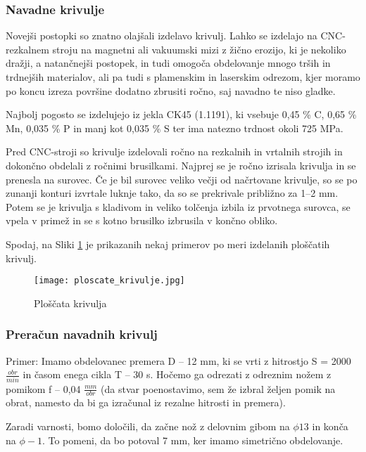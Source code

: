 \subsubsection{Navadne krivulje}
Novejši postopki so znatno olajšali izdelavo krivulj.
Lahko se izdelajo na CNC-rezkalnem stroju na magnetni ali vakuumski mizi
z žično erozijo, ki je nekoliko dražji, a natančnejši postopek, in tudi omogoča
obdelovanje mnogo trših in trdnejših materialov, ali pa tudi s
plamenskim in laserskim odrezom, kjer moramo po koncu izreza površine
dodatno zbrusiti ročno, saj navadno te niso gladke.

Najbolj pogosto se izdelujejo iz jekla CK45 (1.1191), ki vsebuje
0,45 \% C, 0,65 \% Mn, 0,035 \% P in manj kot 0,035 \% S ter ima natezno trdnost okoli 725 MPa. \cite{interna}

Pred CNC-stroji so krivulje izdelovali ročno na rezkalnih in vrtalnih strojih
in dokončno obdelali z ročnimi brusilkami.
Najprej se je ročno izrisala krivulja in se prenesla na surovec.
Če je bil surovec veliko večji od načrtovane krivulje, so se po
zunanji konturi izvrtale luknje tako, da so se prekrivale približno za 1--2 mm. Potem se je krivulja s kladivom in veliko tolčenja izbila iz prvotnega surovca,
se vpela v primež in se s kotno brusilko izbrusila v končno obliko.

Spodaj, na Sliki \ref{ploscate_krivulje} je prikazanih nekaj primerov
po meri izdelanih ploščatih krivulj.

\begin{figure}[H]
	\begin{center}
		\texttt{[image: ploscate\_krivulje.jpg]}
		\caption{Ploščata krivulja
			\cite{lasten}}
		\label{ploscate_krivulje}
	\end{center}
\end{figure}

\subsubsection{Preračun navadnih krivulj}
\label{izracun_krivulj}
Primer: Imamo obdelovanec premera D -- 12 mm, ki se vrti z hitrostjo S = 2000 \( \frac{obr}{min} \)
in časom enega cikla T -- 30 s. Hočemo ga odrezati z odreznim nožem z pomikom f -- 0,04 \( \frac{mm}{obr} \)
(da stvar poenostavimo, sem že izbral željen pomik na obrat, namesto da bi ga
izračunal iz rezalne hitrosti in premera).

Zaradi varnosti, bomo določili, da začne nož z delovnim gibom
na $\phi13$ in konča na $\phi-1$. To pomeni, da bo potoval 7 mm, ker
imamo simetrično obdelovanje.

